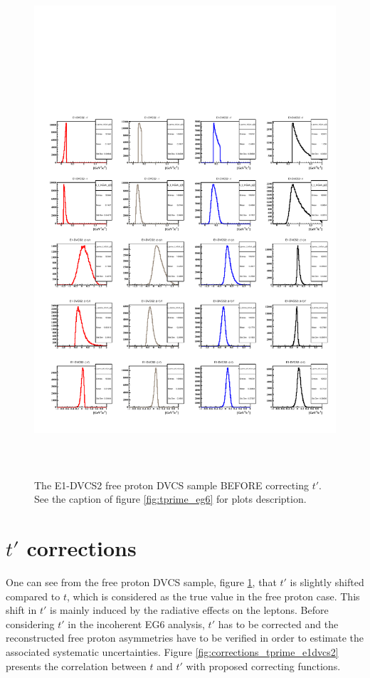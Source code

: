 \documentclass[a4paper,11pt,twoside]{article}
\begin{document}
\begin{figure}[h!]
\centering
\includegraphics[height=19.0cm]{fig/before_corrections_E1-dvcs2-t_tprime_Incoh.pdf}
\caption{The E1-DVCS2 free proton DVCS sample BEFORE correcting $t'$. See the 
caption of figure \ref{fig:tprime_eg6} for plots description.}
\label{fig:tprime_e1dvcs2}
\end{figure}


\section{$t'$ corrections}
One can see from the free proton DVCS sample, figure \ref{fig:tprime_e1dvcs2}, 
that $t'$ is slightly shifted compared to $t$, which is considered as the true 
value in the free proton case. This shift in $t'$ is mainly induced by the 
radiative effects on the leptons. Before considering $t'$ in the incoherent EG6 
analysis, $t'$ has to be corrected and the reconstructed free proton 
asymmetries have to be verified in order to estimate the associated systematic 
uncertainties. Figure \ref{fig:corrections_tprime_e1dvcs2} presents the 
correlation between $t$ and $t'$ with proposed correcting functions.
\end{document}
